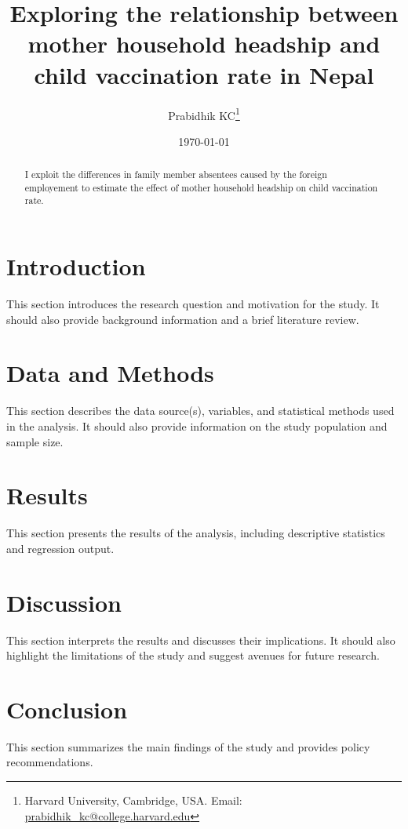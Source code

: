 \documentclass[12pt]{article}
\title{Exploring the relationship between mother household headship and child vaccination rate in Nepal
}
\author{Prabidhik KC\thanks{Harvard University, Cambridge, USA. Email: \href{mailto:prabidhik_kc@college.harvard.edu}{prabidhik_kc@college.harvard.edu}}}
\date{\today}
\begin{document}
\maketitle

\begin{abstract}
I exploit the differences in family member absentees caused by the foreign employement to estimate the effect of mother household headship on child vaccination rate.
\end{abstract}

\section{Introduction}
This section introduces the research question and motivation for the study. It should also provide background information and a brief literature review.

\section{Data and Methods}
This section describes the data source(s), variables, and statistical methods used in the analysis. It should also provide information on the study population and sample size.

\section{Results}
This section presents the results of the analysis, including descriptive statistics and regression output.

\section{Discussion}
This section interprets the results and discusses their implications. It should also highlight the limitations of the study and suggest avenues for future research.

\section{Conclusion}
This section summarizes the main findings of the study and provides policy recommendations.



\end{document}
